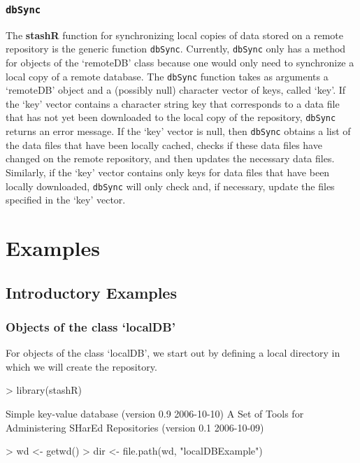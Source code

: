 \documentclass{article}
\newcommand{\pkg}{\textbf}
\newcommand{\code}{\texttt}
\begin{document}
\subsubsection{\code{dbSync}}\label{synch-interface}
The \pkg{stashR} function for synchronizing local copies
of data stored on a remote repository is the generic function
\code{dbSync}. Currently, \code{dbSync} only has a method for
objects of the `remoteDB' class because one would only need
to synchronize a local copy of a remote database. The
\code{dbSync} function takes as arguments a `remoteDB'
object and a (possibly null) character vector of keys, called
`key'. If the `key' vector contains a character string key that
corresponds to a data file that has not yet been downloaded to the
local copy of the repository, \code{dbSync} returns an error
message. If the `key' vector is null, then \code{dbSync} obtains a
list of the data files that have been locally cached, checks if
these data files have changed on the remote repository, and then
updates the necessary data files. Similarly, if the `key' vector
contains only keys for data files that have been locally
downloaded, \code{dbSync} will only check and, if necessary,
update the files specified in the `key' vector.


\section{Examples}

\subsection{Introductory Examples}

\subsubsection{Objects of the class `localDB'} 

For objects of the class `localDB', we start out by 
defining a local directory in which we will create the 
repository.

\begin{Schunk}
\begin{Sinput}
> library(stashR)
\end{Sinput}
\begin{Soutput}
Simple key-value database (version 0.9 2006-10-10)
A Set of Tools for Administering SHarEd Repositories (version 0.1
2006-10-09)
\end{Soutput}
\begin{Sinput}
> wd <- getwd()
> dir <- file.path(wd, "localDBExample")
\end{Sinput}
\end{Schunk}
\end{document}
